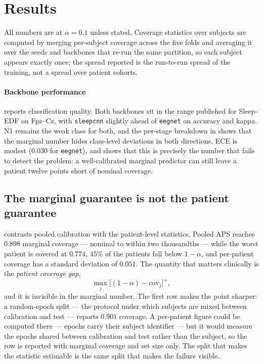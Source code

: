 \section{Results}
\label{sec:results}

All numbers are at $\alpha=0.1$ unless stated. Coverage statistics over
subjects are computed by merging per-subject coverage across the five folds
and averaging it over the seeds and backbones that re-run the same
partition, so each subject appears exactly once; the spread reported is the
run-to-run spread of the training, not a spread over patient cohorts.

\paragraph{Backbone performance}
 reports classification quality. Both backbones sit in the
range published for Sleep-EDF on Fpz--Cz, with \texttt{sleepcnn} slightly
ahead of \texttt{eegnet} on accuracy and kappa. N1 remains the weak class for
both, and the per-stage breakdown in  shows that the
marginal number hides class-level deviations in both directions. ECE is modest ($0.030$ for \texttt{eegnet}), and
 shows that this is precisely the number that fails
to detect the problem: a well-calibrated marginal predictor can still leave a
patient twelve points short of nominal coverage.



\subsection{The marginal guarantee is not the patient guarantee}
\label{sec:results-patient}

 contrasts pooled calibration with the patient-level
statistics. Pooled APS reaches $0.898$ marginal coverage --- nominal to within
two thousandths --- while the worst patient is covered at $0.774$, $45\%$ of
the patients fall below $1-\alpha$, and per-patient coverage has a standard
deviation of $0.051$. The quantity that matters clinically is the
\emph{patient coverage gap},
\begin{equation}
\max_{j}\big[(1-\alpha)-\mathrm{cov}_j\big]^{+},
\end{equation}
and it is invisible in the marginal number. The first row makes the point sharper: a random-epoch split --- the
protocol under which subjects are mixed between calibration and test ---
reports $0.901$ coverage. A per-patient figure could be computed there ---
epochs carry their subject identifier --- but it would measure the epochs
shared between calibration and test rather than the subject, so the row is
reported with marginal coverage and set size only. The split that makes the
statistic estimable is the same split that makes the failure visible.

